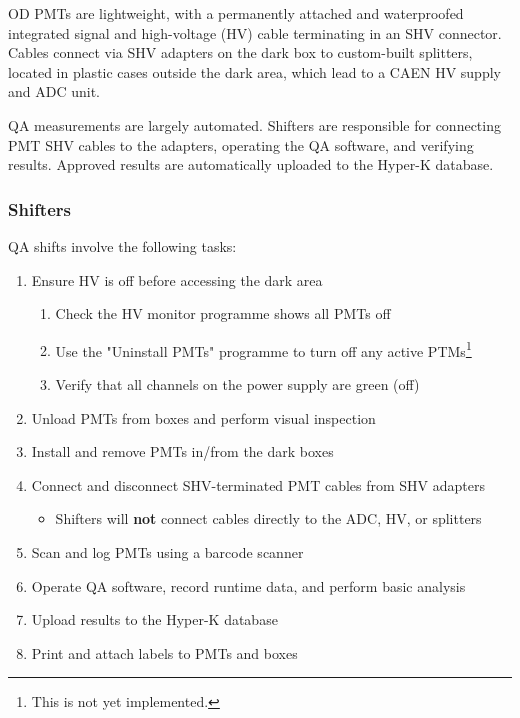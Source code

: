 \documentclass[12pt,a4paper]{article}
\begin{document}
OD PMTs are lightweight, with a permanently attached and waterproofed integrated signal and high-voltage (HV) cable terminating in an SHV connector. Cables connect via SHV adapters on the dark box to custom-built splitters, located in plastic cases outside the dark area, which lead to a CAEN HV supply and ADC unit.

QA measurements are largely automated. Shifters are responsible for connecting PMT SHV cables to the adapters, operating the QA software, and verifying results. Approved results are automatically uploaded to the Hyper-K database.

\subsubsection*{Shifters}
QA shifts involve the following tasks:
\begin{enumerate}
    \item Ensure HV is off before accessing the dark area
    \begin{enumerate}
        \item Check the HV monitor programme shows all PMTs off
        \item Use the "Uninstall PMTs" programme to turn off any active PTMs\footnote{This is not yet implemented.}
        \item Verify that all channels on the power supply are green (off)
    \end{enumerate}
    \item Unload PMTs from boxes and perform visual inspection
    \item Install and remove PMTs in/from the dark boxes
    \item Connect and disconnect SHV-terminated PMT cables from SHV adapters
    \begin{itemize}
        \item Shifters will \textbf{not} connect cables directly to the ADC, HV, or splitters
    \end{itemize}
    \item Scan and log PMTs using a barcode scanner
    \item Operate QA software, record runtime data, and perform basic analysis
    \item Upload results to the Hyper-K database
    \item Print and attach labels to PMTs and boxes
\end{enumerate}
\end{document}
